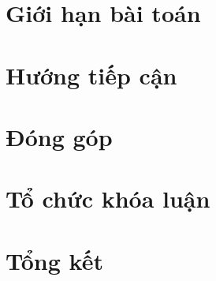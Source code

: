 \section{Giới hạn bài toán}
\section{Hướng tiếp cận}
\section{Đóng góp}
\section{Tổ chức khóa luận}
\section{Tổng kết}

\newpage



